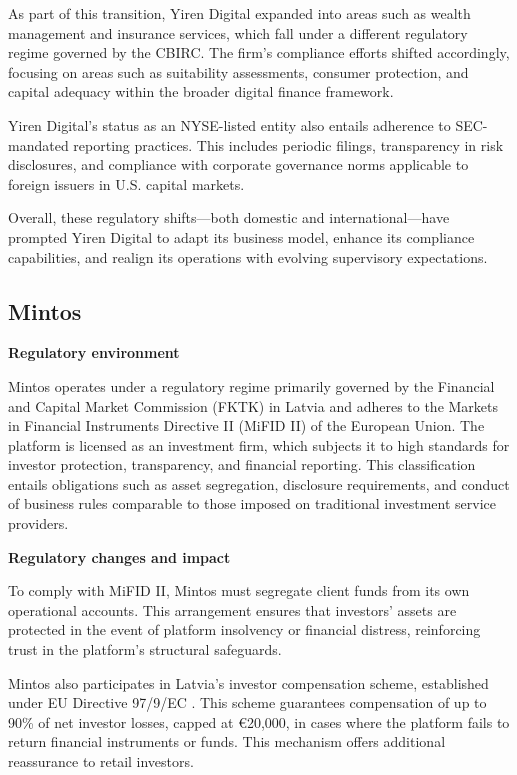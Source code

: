 \documentclass[pdflatex,sn-apa]{sn-jnl}%
\theoremstyle{thmstyleone}%
\theoremstyle{thmstyletwo}%
\theoremstyle{thmstylethree}%
\begin{document}
As part of this transition, Yiren Digital expanded into areas such as wealth management and insurance services, which fall under a different regulatory regime governed by the CBIRC. The firm’s compliance efforts shifted accordingly, focusing on areas such as suitability assessments, consumer protection, and capital adequacy within the broader digital finance framework.

Yiren Digital’s status as an NYSE-listed entity also entails adherence to SEC-mandated reporting practices. This includes periodic filings, transparency in risk disclosures, and compliance with corporate governance norms applicable to foreign issuers in U.S. capital markets.

Overall, these regulatory shifts—both domestic and international—have prompted Yiren Digital to adapt its business model, enhance its compliance capabilities, and realign its operations with evolving supervisory expectations.

\subsection{Mintos}

\textbf{Regulatory environment}

Mintos operates under a regulatory regime primarily governed by the Financial and Capital Market Commission (FKTK) in Latvia and adheres to the Markets in Financial Instruments Directive II (MiFID II) \citep{european_securities_and_markets_authority_mifid_2014} of the European Union. The platform is licensed as an investment firm, which subjects it to high standards for investor protection, transparency, and financial reporting. This classification entails obligations such as asset segregation, disclosure requirements, and conduct of business rules comparable to those imposed on traditional investment service providers.

\textbf{Regulatory changes and impact}

To comply with MiFID II, Mintos must segregate client funds from its own operational accounts. This arrangement ensures that investors’ assets are protected in the event of platform insolvency or financial distress, reinforcing trust in the platform’s structural safeguards.

Mintos also participates in Latvia’s investor compensation scheme, established under EU Directive 97/9/EC \citep{official_journal_l_084_directive_1997}. This scheme guarantees compensation of up to 90\% of net investor losses, capped at €20,000, in cases where the platform fails to return financial instruments or funds. This mechanism offers additional reassurance to retail investors.
\end{document}
